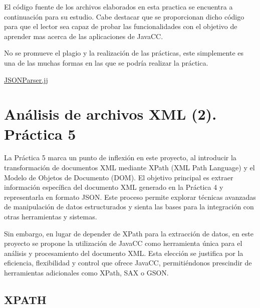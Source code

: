 \noindent El código fuente de los archivos elaborados en esta practica se encuentra a continuación para su estudio. Cabe destacar que se proporcionan dicho código para que el lector sea capaz de probar las funcionalidades con el objetivo de aprender mas acerca de las aplicaciones de JavaCC.

No se promueve el plagio y la realización de las prácticas, este simplemente es una de las muchas formas en las que se podría realizar la práctica.

\hyperref[sec:JSONParser]{JSONParser.jj}

\section{Análisis de archivos XML (2). Práctica 5}


\noindent La Práctica 5 marca un punto de inflexión en este proyecto, al introducir la transformación de documentos XML mediante XPath (XML Path Language) y el Modelo de Objetos de Documento (DOM). El objetivo principal es extraer información específica del documento XML generado en la Práctica 4 y representarla en formato JSON. Este proceso permite explorar técnicas avanzadas de manipulación de datos estructurados y sienta las bases para la integración con otras herramientas y sistemas.

Sin embargo, en lugar de depender de XPath para la extracción de datos, en este proyecto se propone la utilización de JavaCC como herramienta única para el análisis y procesamiento del documento XML. Esta elección se justifica por la eficiencia, flexibilidad y control que ofrece JavaCC, permitiéndonos prescindir de herramientas adicionales como XPath, SAX o GSON.

\subsection{XPATH}

